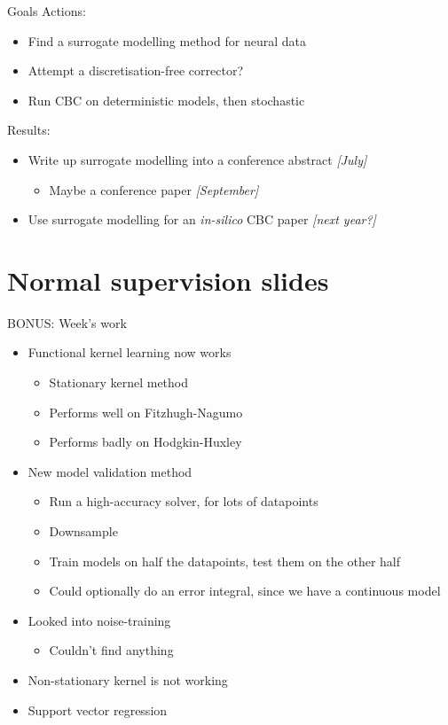 \documentclass[presentation]{beamer}
\begin{document}
\begin{frame}[label={sec:org37f5b1e}]{Goals}
Actions:
\begin{itemize}
\item Find a surrogate modelling method for neural data
\item Attempt a discretisation-free corrector?
\item Run CBC on deterministic models, then stochastic
\end{itemize}

\vfill

Results:
\begin{itemize}
\item Write up surrogate modelling into a conference abstract \emph{[July]}
\begin{itemize}
\item Maybe a conference paper \emph{[September]}
\end{itemize}
\item Use surrogate modelling for an \emph{in-silico} CBC paper \emph{[next year?]}
\end{itemize}
\end{frame}


\section{Normal supervision slides}
\label{sec:orgf75e015}
\begin{frame}[label={sec:org57a9471}]{BONUS: Week's work}
\begin{itemize}[<+->]
\item Functional kernel learning now works
\begin{itemize}
\item Stationary kernel method
\item Performs well on Fitzhugh-Nagumo
\item Performs badly on Hodgkin-Huxley
\end{itemize}
\item New model validation method
\begin{itemize}
\item Run a high-accuracy solver, for lots of datapoints
\item Downsample
\item Train models on half the datapoints, test them on the other half
\item Could optionally do an error integral, since we have a continuous model
\end{itemize}
\item Looked into noise-training
\begin{itemize}
\item Couldn't find anything
\end{itemize}
\item Non-stationary kernel is not working
\item Support vector regression
\end{itemize}
\end{frame}
\end{document}

